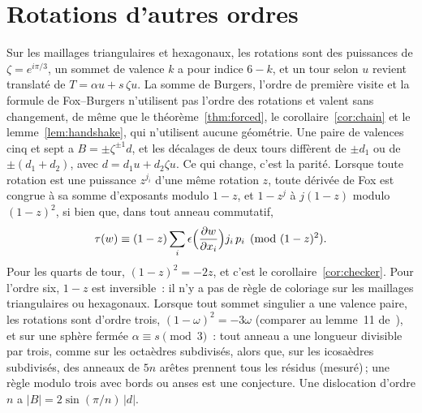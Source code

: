 \documentclass[11pt,a4paper]{article}
\newcommand{\shift}{s}
\begin{document}



\appendix

\section{Rotations d'autres ordres}\label{app:orders}

Sur les maillages triangulaires et hexagonaux, les rotations sont des
puissances de $\zeta = e^{i\pi/3}$, un sommet de valence $k$ a pour indice $6
- k$, et un tour selon $u$ revient translaté de $T = \alpha u + \shift\, \zeta
u$. La somme de Burgers, l'ordre de première visite et la formule de
Fox--Burgers n'utilisent pas l'ordre des rotations et valent sans changement,
de même que le théorème~\ref{thm:forced}, le corollaire~\ref{cor:chain} et le
lemme~\ref{lem:handshake}, qui n'utilisent aucune géométrie. Une paire de
valences cinq et sept a $B = \pm\zeta^{\pm1} d$, et les décalages de deux
tours diffèrent de $\pm d_1$ ou de $\pm(d_1 + d_2)$, avec $d = d_1 u + d_2
\zeta u$. Ce qui change, c'est la parité. Lorsque toute rotation est une
puissance $z^{j_i}$ d'une même rotation $z$, toute dérivée de Fox est
congrue à sa somme d'exposants modulo $1 - z$, et $1 - z^j$ à $j(1 - z)$
modulo $(1 - z)^2$, si bien que, dans tout anneau commutatif,
\[
  \tau(w) \equiv (1 - z) \sum_i \epsilon\Bigl(\frac{\partial w}{\partial
  x_i}\Bigr) j_i\, p_i \pmod{(1 - z)^2}.
\]
Pour les quarts de tour, $(1 - z)^2 = -2z$, et c'est le
corollaire~\ref{cor:checker}. Pour l'ordre six, $1 - z$ est inversible~: il
n'y a pas de règle de coloriage sur les maillages triangulaires ou
hexagonaux. Lorsque tout sommet singulier a une valence paire, les rotations
sont d'ordre trois, $(1 - \omega)^2 = -3\omega$ (comparer au lemme~11
de~\cite{izmestiev2013torus}), et sur une sphère fermée $\alpha \equiv \shift
\pmod 3$~: tout anneau a une longueur divisible par trois, comme sur les
octaèdres subdivisés, alors que, sur les icosaèdres subdivisés, des anneaux de
$5n$ arêtes prennent tous les résidus (mesuré)\,; une règle modulo trois avec
bords ou anses est une conjecture. Une dislocation d'ordre $n$ a $|B| =
2\sin(\pi/n)\,|d|$.
\end{document}
